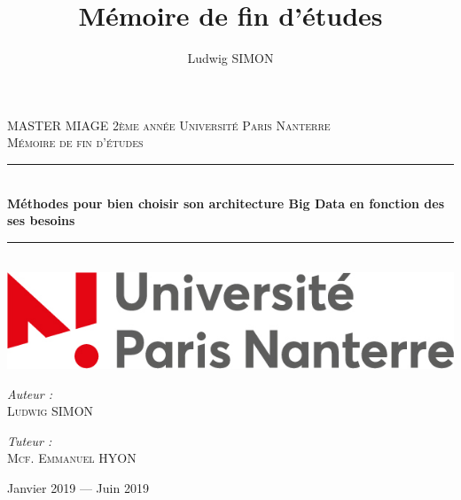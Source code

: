 \documentclass[12pt, twoside, openright]{report}
\author{Ludwig SIMON}
\title{Mémoire de fin d'études}
\begin{document}
%

\setlength{\parindent}{0cm}
\setlength{\parskip}{1ex plus 0.5ex minus 0.2ex}
\newcommand{\hsp}{\hspace{20pt}}
\newcommand{\HRule}{\rule{\linewidth}{0.5mm}}

\begin{titlepage}
  \begin{sffamily}
  \begin{center}

    \textsc{\LARGE MASTER MIAGE 2ème année \linebreak Université Paris Nanterre}\\[2cm]

    \textsc{\Large Mémoire de fin d'études}\\[1.5cm]

    \HRule \\[0.4cm]
    { \huge \bfseries Méthodes pour bien choisir son architecture Big Data en fonction des ses besoins\\[0.4cm] }

    \HRule \\[2cm]
    \includegraphics[scale=0.40]{img/logo_nanterre.jpg}
    \hspace{2cm}
    
    \vfill
  \begin{minipage}{0.4\textwidth}
      \begin{flushleft} \large
        \emph{Auteur :}\\ \textsc{Ludwig SIMON}\\
      \end{flushleft}
    \end{minipage}
    \begin{minipage}{0.4\textwidth}
      \begin{flushright} \large
        \emph{Tuteur :}\\ \textsc{Mcf. Emmanuel HYON}\\
      \end{flushright}
    \end{minipage}
    \vfill
    {\large Janvier 2019 — Juin 2019}
  \end{center}
  \end{sffamily}
\end{titlepage}
\end{document}
